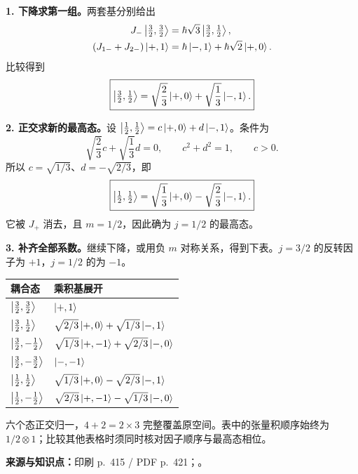 \begin{checkedsolution}
\textbf{1. 下降求第一组。}两套基分别给出
\begin{align}
  J_-\left|\tfrac32,\tfrac32\right\rangle&=\hbar\sqrt3\left|\tfrac32,\tfrac12\right\rangle,\\
  (J_{1-}+J_{2-})\left|+,1\right\rangle&=\hbar\left|-,1\right\rangle+\hbar\sqrt2\left|+,0\right\rangle.
\end{align}
比较得到
\begin{equation}
  \boxed{\left|\tfrac32,\tfrac12\right\rangle
     =\sqrt{\frac23}\left|+,0\right\rangle+\sqrt{\frac13}\left|-,1\right\rangle.}
\end{equation}

\textbf{2. 正交求新的最高态。}设 $\left|\tfrac12,\tfrac12\right\rangle=c\left|+,0\right\rangle+d\left|-,1\right\rangle$。条件为
\begin{equation}
  \sqrt{\frac23}c+\sqrt{\frac13}d=0,\qquad c^2+d^2=1,\qquad c>0.
\end{equation}
所以 $c=\sqrt{1/3}$、$d=-\sqrt{2/3}$，即
\begin{equation}
  \boxed{\left|\tfrac12,\tfrac12\right\rangle
     =\sqrt{\frac13}\left|+,0\right\rangle-\sqrt{\frac23}\left|-,1\right\rangle.}
\end{equation}
它被 $J_+$ 消去，且 $m=1/2$，因此确为 $j=1/2$ 的最高态。

\textbf{3. 补齐全部系数。}继续下降，或用负 $m$ 对称关系，得到下表。$j=3/2$ 的反转因子为 $+1$，$j=1/2$ 的为 $-1$。
\begin{center}
\renewcommand{\arraystretch}{1.4}
\begin{tabular}{@{}ll@{}}
  \toprule
  耦合态 & 乘积基展开 \\
  \midrule
  $\left|\tfrac32,\tfrac32\right\rangle$ & $\left|+,1\right\rangle$ \\
  $\left|\tfrac32,\tfrac12\right\rangle$ & $\sqrt{2/3}\left|+,0\right\rangle+\sqrt{1/3}\left|-,1\right\rangle$ \\
  $\left|\tfrac32,-\tfrac12\right\rangle$ & $\sqrt{1/3}\left|+,-1\right\rangle+\sqrt{2/3}\left|-,0\right\rangle$ \\
  $\left|\tfrac32,-\tfrac32\right\rangle$ & $\left|-,-1\right\rangle$ \\
  $\left|\tfrac12,\tfrac12\right\rangle$ & $\sqrt{1/3}\left|+,0\right\rangle-\sqrt{2/3}\left|-,1\right\rangle$ \\
  $\left|\tfrac12,-\tfrac12\right\rangle$ & $\sqrt{2/3}\left|+,-1\right\rangle-\sqrt{1/3}\left|-,0\right\rangle$ \\
  \bottomrule
\end{tabular}
\end{center}
六个态正交归一，$4+2=2\times3$ 完整覆盖原空间。表中的张量积顺序始终为 $1/2\otimes1$；比较其他表格时须同时核对因子顺序与最高态相位。
\end{checkedsolution}

\textbf{来源与知识点：}印刷 p.~415 / PDF p.~421；。

